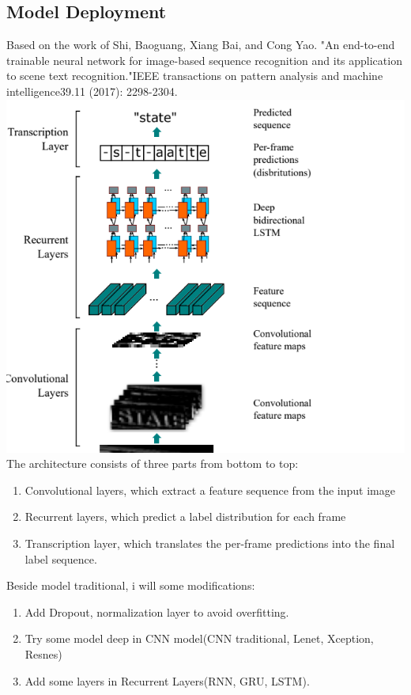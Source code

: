 \documentclass[14pt]{extarticle}
\newcommand{\<}{\langle}
\renewcommand{\>}{\rangle}
\theoremstyle{definition}
\begin{document}
\subsection{Model Deployment}
Based on the work of Shi, Baoguang, Xiang Bai, and Cong Yao. "An end-to-end trainable neural network for image-based sequence recognition and its application to scene text recognition."IEEE transactions on pattern analysis and machine intelligence39.11 (2017): 2298-2304.\cite{crnn}\cite{buildcrnn} \newline
\includegraphics[width=170mm,scale=0.7]{crnn.png}
The architecture consists of three parts from bottom to top: 
\begin{enumerate}
    \item Convolutional layers, which extract a feature sequence from the input image 
    \item Recurrent layers, which predict a label distribution for each frame 
    \item Transcription layer, which translates the per-frame predictions into the final label sequence.\cite{ctc}
\end{enumerate}
Beside model traditional, i will some modifications: 
\begin{enumerate}
    \item Add Dropout, normalization layer to avoid overfitting.
    \item Try some model deep in CNN model(CNN traditional, Lenet, Xception, Resnes)
    \item Add some layers in Recurrent Layers(RNN, GRU, LSTM).
\end{enumerate}
\end{document}
